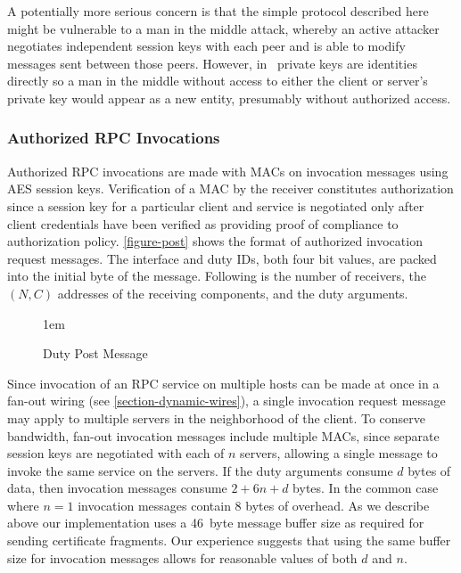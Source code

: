 A potentially more serious concern is that the simple protocol described
here might be vulnerable to a man in the middle attack, whereby an
active attacker negotiates independent session keys with each peer and
is able to modify messages sent between those peers. However, in \RT\
private keys are identities directly so a man in the middle without
access to either the client or server's private key would appear as a
new entity, presumably without authorized access.


\subsubsection{Authorized RPC Invocations}

Authorized RPC invocations are made with MACs on invocation messages
using AES session keys. Verification of a MAC by the receiver
constitutes authorization since a session key for a particular client
and service is negotiated only after client credentials have been
verified as providing proof of compliance to authorization policy.
\autoref{figure-post} shows the format of authorized invocation request
messages. The interface and duty IDs, both four bit values, are packed
into the initial byte of the message. Following is the number of
receivers, the $(N, C)$ addresses of the receiving components, and the
duty arguments.

\begin{figure}[t]
  
  \centerline{\raise 1em\box\graph}
  \caption{Duty Post Message}
  \label{figure-post}
\end{figure}

Since invocation of an RPC service on multiple hosts can be made at once
in a fan-out wiring (see \autoref{section-dynamic-wires}), a single
invocation request message may apply to multiple servers in the
neighborhood of the client. To conserve bandwidth, fan-out invocation
messages include multiple MACs, since separate session keys are
negotiated with each of $n$ servers, allowing a single message to invoke
the same service on the servers. If the duty arguments consume $d$ bytes
of data, then invocation messages consume $2 + 6n + d$ bytes. In the
common case where $n = 1$ invocation messages contain $8$ bytes of
overhead. As we describe above our implementation uses a 46~byte message
buffer size as required for sending certificate fragments. Our
experience suggests that using the same buffer size for invocation
messages allows for reasonable values of both $d$ and $n$.

